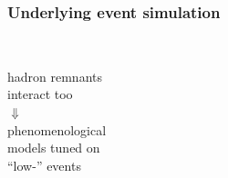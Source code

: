 \begin{frame}\frametitle{Underlying event simulation}
\centering


\begin{minipage}{.65\textwidth}\centering
$\quad$
\end{minipage}\begin{minipage}{.35\textwidth}\centering\myskip
hadron remnants\\ interact too\\
{\LARGE $\Downarrow$}\\
phenomenological\\ models tuned on\\
``low-\pt'' events
\end{minipage}

\vspace{.5\paperheight}


\end{frame}


